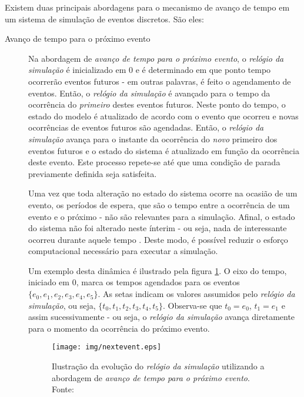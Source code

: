 Existem duas principais abordagens para o mecanismo de avanço de tempo em um sistema de simulação de eventos discretos. São eles:

\begin{description}
\item[Avanço de tempo para o próximo evento] \hfill

Na abordagem de \textit{avanço de tempo para o próximo evento}, o
\textit{relógio da simulação} é inicializado em 0 e é determinado em que ponto
tempo ocorrerão eventos futuros - em outras palavras, é feito o agendamento de
eventos. Então, o \textit{relógio da simulação} é avançado para o tempo da
ocorrência do \textit{primeiro} destes eventos futuros. Neste ponto do tempo, o
estado do modelo é atualizado de acordo com o evento que ocorreu e novas
ocorrências de eventos futuros são agendadas. Então, o \textit{relógio da
simulação} avança para o instante da ocorrência do \textit{novo} primeiro dos
eventos futuros e o estado do sistema é atualizado em função da ocorrência deste
evento. Este processo repete-se até que uma condição de parada previamente
definida seja satisfeita.

Uma vez que toda alteração no estado do sistema ocorre na ocasião de um evento,
os períodos de espera, que são o tempo entre a ocorrência de um evento e o
próximo - não são relevantes para a simulação. Afinal, o estado do sistema não
foi alterado neste ínterim - ou seja, nada de interessante ocorreu durante
aquele tempo \cite{Sim}. Deste modo, é possível reduzir o esforço computacional
necessário para executar a simulação.

Um exemplo desta dinâmica é ilustrado pela figura \ref{fig:nextevent}. O eixo do
tempo, iniciado em 0, marca os tempos agendados para os eventos $\{e_{0}, e_{1},
e_{2}, e_{3}, e_{4}, e_{5}\}$. As setas indicam os valores assumidos pelo
\textit{relógio da simulação}, ou seja, $\{t_{0}, t_{1}, t_{2}, t_{3}, t_{4},
t_{5}\}$. Observa-se que $t_{0} = e_{0}$, $t_{1} = e_{1}$ e assim sucessivamente
- ou seja, o \textit{relógio da simulação} avança diretamente para o momento
da ocorrência do próximo evento.

\begin{figure}[htb!]
\centering\texttt{[image: img/nextevent.eps]}
\caption[Avanço de tempo para o próximo evento]{\label{fig:nextevent}Ilustração da evolução do \textit{relógio da simulação} utilizando a abordagem de \textit{avanço de tempo para o próximo evento}. Fonte:~\cite{Law}}
\end{figure}


\end{description}

